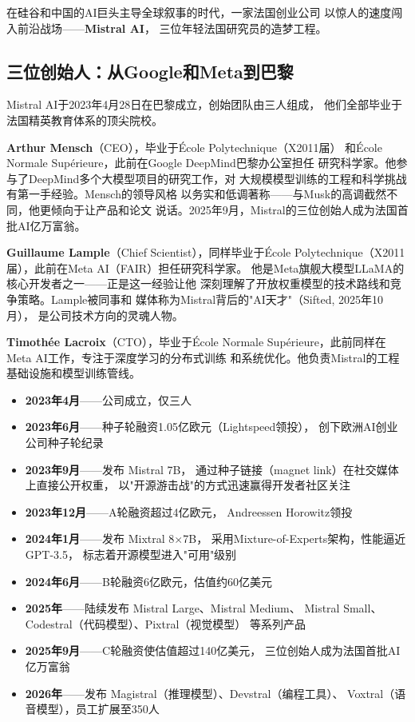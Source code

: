 在硅谷和中国的AI巨头主导全球叙事的时代，一家法国创业公司
以惊人的速度闯入前沿战场——\textbf{Mistral AI}，
三位年轻法国研究员的造梦工程。

\subsection{三位创始人：从Google和Meta到巴黎}

Mistral AI于2023年4月28日在巴黎成立，创始团队由三人组成，
他们全部毕业于法国精英教育体系的顶尖院校。

\textbf{Arthur Mensch}（CEO），毕业于\'{E}cole Polytechnique（X2011届）
和\'{E}cole Normale Sup\'{e}rieure，此前在Google DeepMind巴黎办公室担任
研究科学家。他参与了DeepMind多个大模型项目的研究工作，对
大规模模型训练的工程和科学挑战有第一手经验。Mensch的领导风格
以务实和低调著称——与Musk的高调截然不同，他更倾向于让产品和论文
说话。2025年9月，Mistral的三位创始人成为法国首批AI亿万富翁。

\textbf{Guillaume Lample}（Chief Scientist），同样毕业于\'{E}cole
Polytechnique（X2011届），此前在Meta AI（FAIR）担任研究科学家。
他是Meta旗舰大模型LLaMA的核心开发者之一——正是这一经验让他
深刻理解了开放权重模型的技术路线和竞争策略。Lample被同事和
媒体称为Mistral背后的"AI天才"（Sifted, 2025年10月），
是公司技术方向的灵魂人物。

\textbf{Timoth\'{e}e Lacroix}（CTO），毕业于\'{E}cole Normale
Sup\'{e}rieure，此前同样在Meta AI工作，专注于深度学习的分布式训练
和系统优化。他负责Mistral的工程基础设施和模型训练管线。

\begin{corebox}
\begin{itemize}
  \item \textbf{2023年4月}——公司成立，仅三人
  \item \textbf{2023年6月}——种子轮融资1.05亿欧元（Lightspeed领投），
    创下欧洲AI创业公司种子轮纪录
  \item \textbf{2023年9月}——发布 Mistral 7B，
    通过种子链接（magnet link）在社交媒体上直接公开权重，
    以"开源游击战"的方式迅速赢得开发者社区关注
  \item \textbf{2023年12月}——A轮融资超过4亿欧元，
    Andreessen Horowitz领投
  \item \textbf{2024年1月}——发布 Mixtral 8$\times$7B，
    采用Mixture-of-Experts架构，性能逼近GPT-3.5，
    标志着开源模型进入"可用"级别
  \item \textbf{2024年6月}——B轮融资6亿欧元，估值约60亿美元
  \item \textbf{2025年}——陆续发布 Mistral Large、Mistral Medium、
    Mistral Small、Codestral（代码模型）、Pixtral（视觉模型）
    等系列产品
  \item \textbf{2025年9月}——C轮融资使估值超过140亿美元，
    三位创始人成为法国首批AI亿万富翁
  \item \textbf{2026年}——发布 Magistral（推理模型）、Devstral（编程工具）、
    Voxtral（语音模型），员工扩展至350人
\end{itemize}
\end{corebox}

